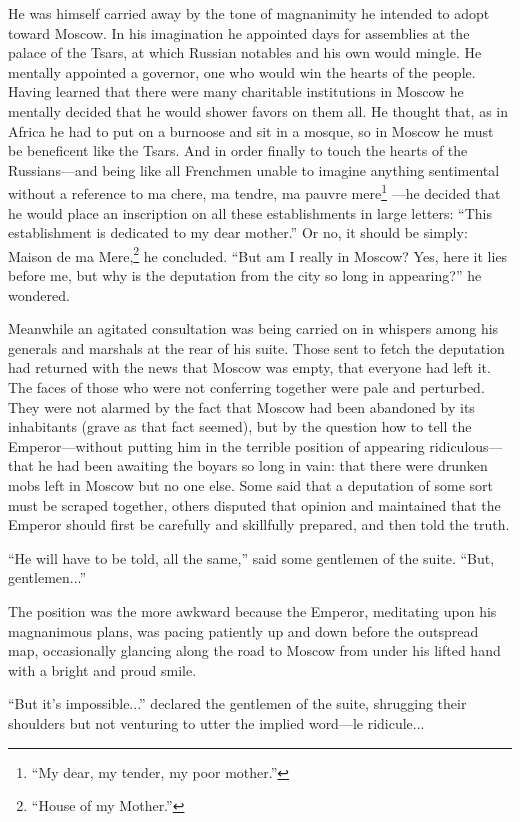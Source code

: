He was himself carried away by the tone of magnanimity he
intended to adopt toward Moscow. In his imagination he appointed
days for assemblies at the palace of the Tsars, at which Russian
notables and his own would mingle. He mentally appointed a
governor, one who would win the hearts of the people. Having
learned that there were many charitable institutions in Moscow he
mentally decided that he would shower favors on them all. He
thought that, as in Africa he had to put on a burnoose and sit in
a mosque, so in Moscow he must be beneficent like the Tsars.  And
in order finally to touch the hearts of the Russians---and being
like all Frenchmen unable to imagine anything sentimental without
a reference to ma chere, ma tendre, ma pauvre mere\footnote{``My
dear, my tender, my poor mother.''} ---he decided that he would
place an inscription on all these establishments in large
letters: ``This establishment is dedicated to my dear mother.''
Or no, it should be simply: Maison de ma Mere,\footnote{``House
of my Mother.''} he concluded. ``But am I really in Moscow? Yes,
here it lies before me, but why is the deputation from the city
so long in appearing?'' he wondered.

Meanwhile an agitated consultation was being carried on in
whispers among his generals and marshals at the rear of his
suite. Those sent to fetch the deputation had returned with the
news that Moscow was empty, that everyone had left it. The faces
of those who were not conferring together were pale and
perturbed. They were not alarmed by the fact that Moscow had been
abandoned by its inhabitants (grave as that fact seemed), but by
the question how to tell the Emperor---without putting him in the
terrible position of appearing ridiculous---that he had been
awaiting the boyars so long in vain: that there were drunken mobs
left in Moscow but no one else. Some said that a deputation of
some sort must be scraped together, others disputed that opinion
and maintained that the Emperor should first be carefully and
skillfully prepared, and then told the truth.

``He will have to be told, all the same,'' said some gentlemen of
the suite. ``But, gentlemen...''

The position was the more awkward because the Emperor, meditating
upon his magnanimous plans, was pacing patiently up and down
before the outspread map, occasionally glancing along the road to
Moscow from under his lifted hand with a bright and proud smile.

``But it's impossible...'' declared the gentlemen of the suite,
shrugging their shoulders but not venturing to utter the implied
word---le ridicule...


